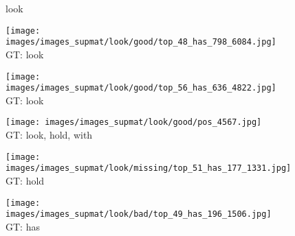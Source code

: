 \documentclass[10pt,twocolumn,letterpaper]{article}
\begin{document}
\begin{figure*}[t]
	\begin{minipage}[t]{0.005\textwidth}
    	\centering
    	\vspace{-8.5ex}
    	\begin{turn}{90}
    	look
    	\end{turn}
    	\vspace{3ex}
   	\end{minipage}
    \hspace{0.01\textwidth}
    \begin{minipage}[t]{0.18\textwidth}
    	\centering
       	\texttt{[image: images/images\_supmat/look/good/top\_48\_has\_798\_6084.jpg]}\\
       	\vspace{0.3ex}
       	GT: look
       	\vspace{0.2ex}
    \end{minipage}  
    \hspace{0.005\textwidth}
    \begin{minipage}[t]{0.18\textwidth}
    	\centering
       	\texttt{[image: images/images\_supmat/look/good/top\_56\_has\_636\_4822.jpg]}\\
       	\vspace{0.3ex}
       	GT: look
       	\vspace{0.2ex}
    \end{minipage} 
    \hspace{0.005\textwidth}
    \begin{minipage}[t]{0.18\textwidth}
    	\centering
       	\texttt{[image: images/images\_supmat/look/good/pos\_4567.jpg]}\\
       	\vspace{0.3ex}
       	GT: look, hold, with
       	\vspace{0.2ex}
    \end{minipage}
    \hspace{0.005\textwidth}
    \begin{minipage}[t]{0.18\textwidth}
       	\centering
    	\texttt{[image: images/images\_supmat/look/missing/top\_51\_has\_177\_1331.jpg]}\\
    	\vspace{0.3ex}
       	GT: hold
       	\vspace{0.2ex}
    \end{minipage}
    \hspace{0.005\textwidth}
    \begin{minipage}[t]{0.18\textwidth}
    	\centering
       	\texttt{[image: images/images\_supmat/look/bad/top\_49\_has\_196\_1506.jpg]}\\
       	\vspace{0.3ex}
       	GT: has
       	\vspace{0.2ex}
    \end{minipage}    
     

\end{figure*}
\end{document}
